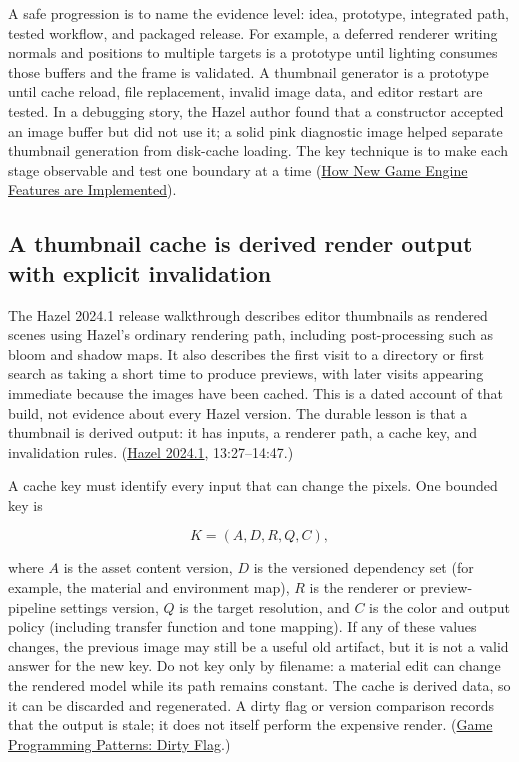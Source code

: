 A safe progression is to name the evidence level: idea, prototype, integrated path, tested workflow, and packaged release. For example, a deferred renderer writing normals and positions to multiple targets is a prototype until lighting consumes those buffers and the frame is validated. A thumbnail generator is a prototype until cache reload, file replacement, invalid image data, and editor restart are tested. In a debugging story, the Hazel author found that a constructor accepted an image buffer but did not use it; a solid pink diagnostic image helped separate thumbnail generation from disk-cache loading. The key technique is to make each stage observable and test one boundary at a time (\href{https://www.youtube.com/watch?v=z1O6AZWuWm4&t=13m56s}{How New Game Engine Features are Implemented}).

\subsection{A thumbnail cache is derived render output with explicit invalidation}\label{06-engine-ii-ch041-a-thumbnail-cache-is-derived-render-output-with-explicit-invalidation}

The Hazel 2024.1 release walkthrough describes editor thumbnails as rendered scenes using Hazel's ordinary rendering path, including post-processing such as bloom and shadow maps. It also describes the first visit to a directory or first search as taking a short time to produce previews, with later visits appearing immediate because the images have been cached. This is a dated account of that build, not evidence about every Hazel version. The durable lesson is that a thumbnail is derived output: it has inputs, a renderer path, a cache key, and invalidation rules. (\href{https://www.youtube.com/watch?v=10OVd1VHEZ4&t=13m27s}{Hazel 2024.1}, 13:27--14:47.)

A cache key must identify every input that can change the pixels. One bounded key is

\[
K=(A,D,R,Q,C),
\]

where \(A\) is the asset content version, \(D\) is the versioned dependency set (for example, the material and environment map), \(R\) is the renderer or preview-pipeline settings version, \(Q\) is the target resolution, and \(C\) is the color and output policy (including transfer function and tone mapping). If any of these values changes, the previous image may still be a useful old artifact, but it is not a valid answer for the new key. Do not key only by filename: a material edit can change the rendered model while its path remains constant. The cache is derived data, so it can be discarded and regenerated. A dirty flag or version comparison records that the output is stale; it does not itself perform the expensive render. (\href{https://github.com/munificent/game-programming-patterns/blob/master/book/dirty-flag.markdown}{Game Programming Patterns: Dirty Flag}.)

